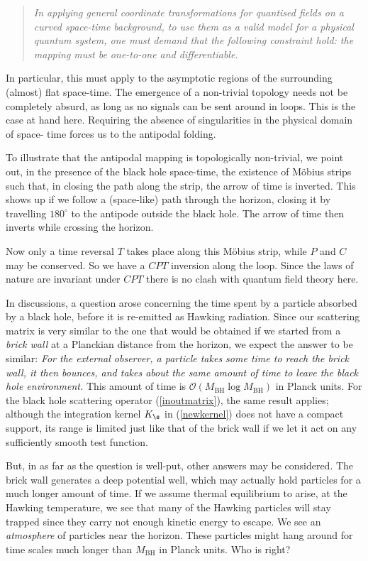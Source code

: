 \documentclass[12pt]{article}
\def\eqn#1{(\ref{#1})}
\def\OO{{\mathcal O}} 	\def\DD{{\mathcal D}}	     \def\ZZ{\mathbb{Z}}
\def\BH{{\mathrm{BH}}}\def\Pl{{\mathrm{Pl}}}\def\inn{{\mathrm{in}}} \def\outt{{\mathrm{out}}}
\begin{document}
\begin{quote} \emph{ In  applying general coordinate transformations for quantised fields on a curved space-time background, to use them as a valid model for a physical quantum system, one must demand that the following constraint hold: the mapping must be one-to-one and differentiable.} \end{quote}
In particular, this must apply to the asymptotic regions of the surrounding (almost) flat space-time.
The emergence of a non-trivial topology needs not be completely absurd, as long as no signals can be sent around in loops. This is the case at hand here. Requiring the absence of singularities in the physical domain of space- time forces us to the antipodal folding.

To illustrate that the antipodal mapping is topologically non-trivial, we point out, in the presence of the black hole space-time,  the existence of M\"obius strips such that, in closing the path along the strip, the arrow of time is inverted. This shows up if we follow a (space-like) path through the horizon, closing it by travelling \(180^\circ\) to the antipode outside the black hole. The arrow of time then inverts while crossing the horizon.

Now only a time reversal \(T\) takes place along this M\"obius strip, while \(P\) and \(C\) may be conserved. So we have a \(CPT\) inversion along the loop. Since the laws of nature are invariant under \(CPT\) there is no clash with quantum field theory here.

In discussions, a question arose concerning the time spent by a particle absorbed by a black hole, before it is re-emitted as Hawking radiation. Since our scattering matrix is very similar to the one that would be obtained if we started from a \emph{brick wall} at a Planckian distance from the horizon, we expect the answer to be similar: \emph{For the external observer, a particle takes some time to reach the brick wall, it then bounces, and takes about the same amount of time to leave the black hole environment.} This amount of time is \(\OO(M_\BH\log M_\BH)\) in Planck units. For the black hole scattering operator \eqn{inoutmatrix}, the same result applies; although the integration kernel \(K_\s\) in \eqn{newkernel} does not have a compact support, its range is limited just like that of the brick wall if we let it act on any sufficiently smooth test function.

But, in as far as the question is well-put, other answers may be considered. The brick wall generates a deep potential well, which may actually hold particles for a much longer amount of time. If we assume thermal equilibrium to arise, at the Hawking temperature, we see that many of the Hawking particles will stay trapped since they carry not enough kinetic energy to escape. We see an \emph{atmosphere} of particles near the horizon. These particles might hang around for time scales much longer than \(M_\BH\) in Planck units. Who is right?
\end{document}

